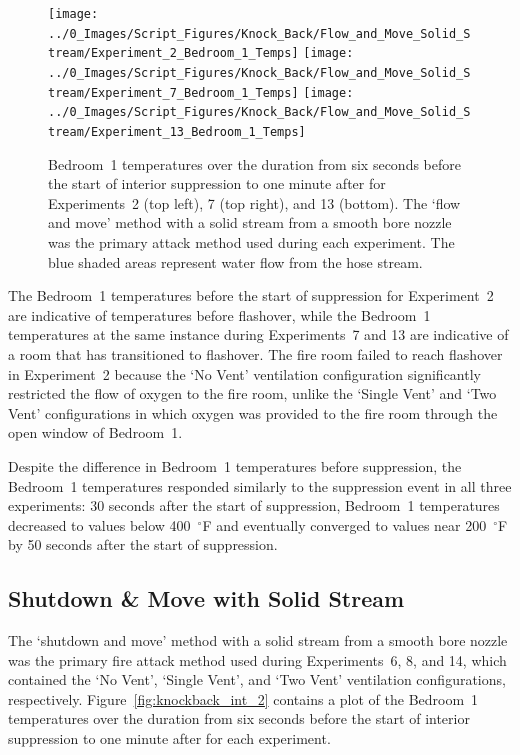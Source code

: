 \documentclass[12pt,oneside]{book}
\begin{document}
\begin{figure}[H]
	\centering
	\texttt{[image: ../0\_Images/Script\_Figures/Knock\_Back/Flow\_and\_Move\_Solid\_Stream/Experiment\_2\_Bedroom\_1\_Temps]}
	\texttt{[image: ../0\_Images/Script\_Figures/Knock\_Back/Flow\_and\_Move\_Solid\_Stream/Experiment\_7\_Bedroom\_1\_Temps]}
	\texttt{[image: ../0\_Images/Script\_Figures/Knock\_Back/Flow\_and\_Move\_Solid\_Stream/Experiment\_13\_Bedroom\_1\_Temps]}
	\caption[Flow \& Move with Solid Stream --- Bedroom~1 Temperatures]{Bedroom~1 temperatures over the duration from six seconds before the start of interior suppression to one minute after for Experiments~2 (top left), 7 (top right), and 13 (bottom). The `flow and move' method with a solid stream from a smooth bore nozzle was the primary attack method used during each experiment. The blue shaded areas represent water flow from the hose stream.} 
	\label{fig:knockback_int_1}
\end{figure}

The Bedroom~1 temperatures before the start of suppression for Experiment~2 are indicative of temperatures before flashover, while the Bedroom~1 temperatures at the same instance during Experiments~7 and 13 are indicative of a room that has transitioned to flashover. The fire room failed to reach flashover in Experiment~2 because the `No Vent' ventilation configuration significantly restricted the flow of oxygen to the fire room, unlike the `Single Vent' and `Two Vent' configurations in which oxygen was provided to the fire room through the open window of Bedroom~1.

Despite the difference in Bedroom~1 temperatures before suppression, the Bedroom~1 temperatures responded similarly to the suppression event in all three experiments: 30 seconds after the start of suppression, Bedroom~1 temperatures decreased to values below 400~$^\circ$F and eventually converged to values near 200~$^\circ$F by 50 seconds after the start of suppression. 

\FloatBarrier

\subsection{Shutdown \& Move with Solid Stream}
The `shutdown and move' method with a solid stream from a smooth bore nozzle was the primary fire attack method used during Experiments~6, 8, and 14, which contained the `No Vent', `Single Vent', and `Two Vent' ventilation configurations, respectively. Figure~\ref{fig:knockback_int_2} contains a plot of the Bedroom~1 temperatures over the duration from six seconds before the start of interior suppression to one minute after for each experiment.
\end{document}
